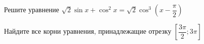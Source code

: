 \begin{ex}
	\begin{condition}
		\begin{enumcols}[label=\asbuk*)]
			\item Решите уравнение \( \sqrt{2}\sin x + \cos^2 x = \sqrt{2}\cos^3{\left(x - \dfrac{\pi}{2}\right)} \)
			\item Найдите все корни уравнения, принадлежащие отрезку \( \left[\dfrac{3\pi}{2};3\pi\right] \)
		\end{enumcols}
	\end{condition}
\end{ex}